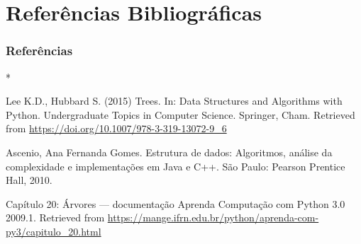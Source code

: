 \documentclass[10pt,aspectratio=169]{beamer}
\theoremstyle{remark}
\theoremstyle{definition}
\begin{document}
\section{Referências Bibliográficas}
\begin{frame}[t,allowframebreaks]
\frametitle{Referências}
%
%
\begin{thebibliography}{*}

         Lee K.D., Hubbard S. (2015) Trees. In: Data Structures and Algorithms with Python. Undergraduate Topics in Computer Science. Springer, Cham. Retrieved from \url{https://doi.org/10.1007/978-3-319-13072-9_6}
        
         Ascenio, Ana Fernanda Gomes. Estrutura de dados: Algoritmos, análise da complexidade e implementações em Java e C++. São Paulo: Pearson Prentice Hall, 2010.
        
         Capítulo 20: Árvores — documentação Aprenda Computação com Python 3.0 2009.1. Retrieved from  \url{https://mange.ifrn.edu.br/python/aprenda-com-py3/capitulo_20.html}
\end{thebibliography}
\end{frame}
\end{document}
